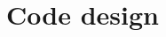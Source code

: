 \documentclass[utf8, a4paper, final, crop]{frontiersSCNS}
\begin{document}
%
%

\section{Code design}
\end{document}
